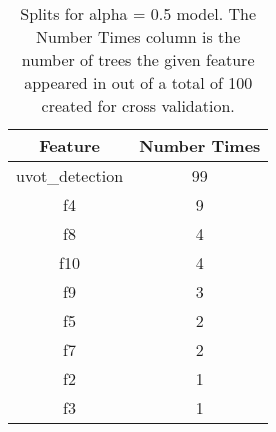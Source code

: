\begin{table}[H]
\begin{center}
\begin{tabular}{cc}
  \hline
Feature & Number Times \\ 
  \hline
uvot\_detection & 99 \\ 
  f4 & 9 \\ 
  f8 & 4 \\ 
  f10 & 4 \\ 
  f9 & 3 \\ 
  f5 & 2 \\ 
  f7 & 2 \\ 
  f2 & 1 \\ 
  f3 & 1 \\ 
   \hline
\end{tabular}
\caption{Splits for alpha = 0.5 model. The Number Times column is the number of trees the given feature appeared in out of a total of 100 created for cross validation.}
\end{center}
\end{table}
